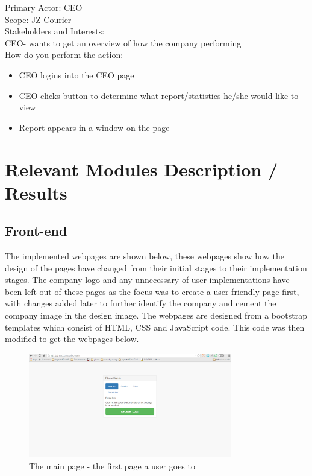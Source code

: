 \documentclass[paper=a4, fontsize=11pt]{scrartcl} %
\numberwithin{equation}{section} %
\numberwithin{figure}{section} %
\numberwithin{table}{section} %
\begin{document}
\begin{itemize}
Primary Actor: \quad \quad CEO \\
Scope:		\quad \quad	JZ Courier  \\
Stakeholders and Interests: \\
CEO- wants to get an overview of how the company performing \\
How do you perform the action: \\
\begin{itemize}
\item  CEO logins into the CEO page
\item CEO clicks button to determine what report/statistics he/she would like to view
\item Report appears in a window on the page 
\end{itemize}


\end{itemize}


\section{Relevant Modules Description / Results}

\subsection{Front-end}
The implemented webpages are shown below, these webpages show how the design of the pages have changed from their initial stages to their implementation stages. The company logo and any unnecessary of user implementations have been left out of these pages as the focus was to create a user friendly page first, with changes added later to further identify the company and cement the company image in the design image. The webpages are designed from a bootstrap templates which consist of HTML, CSS and JavaScript code. This code was then modified to get the webpages below.

\begin{figure}[hbt!]
\centering
\includegraphics[width=3.5in]{pictures/main_page.png}
\caption{The main page - the first page a user goes to}
\label{MainPage}
\end{figure}
\end{document}
